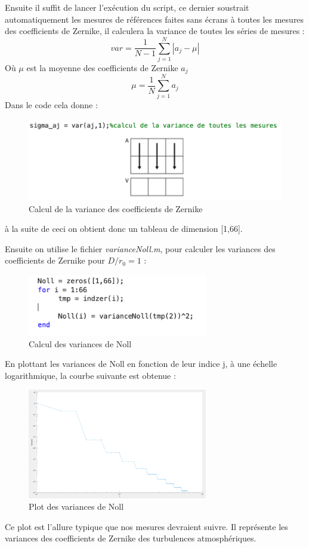 Ensuite il suffit de lancer l'exécution du script, ce dernier soustrait automatiquement les mesures de références
faites sans écrans à toutes les mesures des coefficients de Zernike, il calculera la variance de toutes les séries de mesures :
\begin{equation}
    var = \frac{1}{N-1}\sum_{j=1}^{N}|a_j - \mu|
\end{equation}
Où $\mu$ est la moyenne des coefficients de Zernike $a_j$
\begin{equation}
    \mu = \frac{1}{N}\sum_{j=1}^{N}a_j
\end{equation}
Dans le code cela donne :
\begin{figure}[H]
    \centering
    \includegraphics[width = 1\textwidth]{assets/figures/mesures/variance_matlab.png}
    \caption{Calcul de la variance des coefficients de Zernike}
\end{figure}
à la suite de ceci on obtient donc un tableau de dimension [1,66].

\newpage
Ensuite on utilise le fichier \textit{varianceNoll.m}, pour calculer les variances des coefficients de Zernike
pour $D/r_0 = 1$ :
\begin{figure}[H]
    \centering
    \includegraphics[width = 0.7\textwidth]{assets/figures/mesures/Calcul_variance_nool.png}
    \caption{Calcul des variances de Noll}
\end{figure}
En plottant les variances de Noll en fonction de leur indice j, à une échelle logarithmique, la courbe suivante est obtenue :
\begin{figure}[H]
    \centering
    \includegraphics[width = 0.7\textwidth]{assets/figures/mesures/plot_variance_Noll.png}
    \caption{Plot des variances de Noll}
\end{figure}
Ce plot est l'allure typique que nos mesures devraient suivre. Il représente les variances des coefficients de Zernike
des turbulences atmosphériques.

